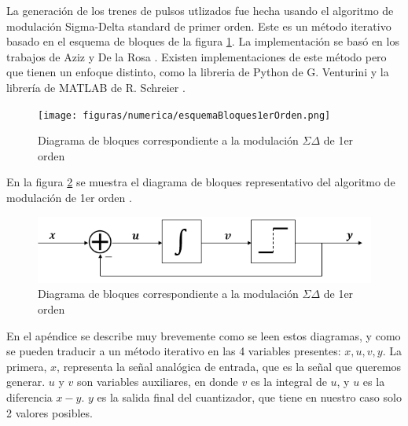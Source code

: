 \documentclass[twoside]{article}
\begin{document}
\begin{multicols}{2}
La generación de los trenes de pulsos utlizados fue hecha usando el algoritmo de modulación Sigma-Delta standard de primer orden. Este es un método iterativo basado en el esquema de bloques de la figura \ref{fig:numerica_esquemaBloques1erOrden}. La implementación se basó en los trabajos de Aziz \cite{aziz1996} y De la Rosa \cite{delarosa2011}. Existen implementaciones de este método pero que tienen un enfoque distinto, como la libreria de Python de G. Venturini \cite{DSpython} y la librería de MATLAB de R. Schreier \cite{DSmatlab}.

\begin{figure}[H]
    \centering
    \texttt{[image: figuras/numerica/esquemaBloques1erOrden.png]}
    \caption{Diagrama de bloques correspondiente a la modulación $\Sigma\Delta$ de 1er orden}
    \label{fig:numerica_esquemaBloques1erOrden}
\end{figure}


En la figura \ref{fig:bloques} se muestra el diagrama de bloques representativo del algoritmo de modulación de 1er orden \cite{script}.

\begin{figure}[H]
\centering
\includegraphics[width=\linewidth]{figuras/bloques_1erorden.png}
\caption{Diagrama de bloques correspondiente a la modulación $\Sigma\Delta$ de 1er orden}
\label{fig:bloques}
\end{figure}

En el apéndice se describe muy brevemente como se leen estos diagramas, y como se pueden traducir a un método iterativo en las 4 variables presentes: $x,u,v,y$.
La primera, $x$, representa la señal analógica de entrada, que es la señal que queremos generar. $u$ y $v$ son variables auxiliares, en donde $v$ es la integral de $u$, y $u$ es la diferencia $x-y$. $y$ es la salida final del cuantizador, que tiene en nuestro caso solo 2 valores posibles.




\end{multicols}
\end{document}
